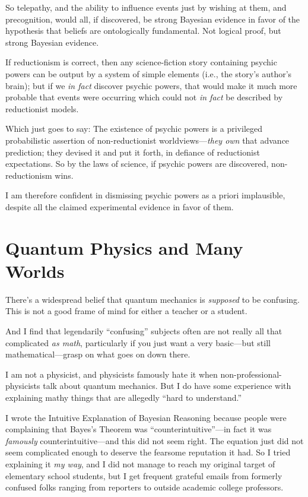 {
 So telepathy, and the ability to influence events just by wishing
at them, and precognition, would all, if discovered, be strong Bayesian
evidence in favor of the hypothesis that beliefs are ontologically
fundamental. Not logical proof, but strong Bayesian evidence.}

{
 If reductionism is correct, then any science-fiction story
containing psychic powers can be output by a system of simple elements
(i.e., the story's author's brain); but
if we \textit{in fact} discover psychic powers, that would make it much
more probable that events were occurring which could not \textit{in
fact} be described by reductionist models.}

{
 Which just goes to say: The existence of psychic powers is a
privileged probabilistic assertion of non-reductionist
worldviews---\textit{they own} that advance prediction; they devised it
and put it forth, in defiance of reductionist expectations. So by the
laws of science, if psychic powers are discovered, non-reductionism
wins.}

{
 I am therefore confident in dismissing psychic powers as a priori
implausible, despite all the claimed experimental evidence in favor of
them.}

\myendsectiontext

\chapter{Quantum Physics and Many Worlds}


{
 There's a widespread belief that quantum mechanics
is \textit{supposed} to be confusing. This is not a good frame of mind
for either a teacher or a student.}

{
 And I find that legendarily
``confusing'' subjects often are not
really all that complicated \textit{as math}, particularly if you just
want a very basic---but still mathematical---grasp on what goes on down
there.}

{
 I am not a physicist, and physicists famously hate it when
non-professional-physicists talk about quantum mechanics. But I do have
some experience with explaining mathy things that are allegedly
``hard to understand.''}

{
 I wrote the Intuitive Explanation of Bayesian Reasoning because
people were complaining that Bayes's Theorem was
``counterintuitive''---in fact it
was \textit{famously} counterintuitive---and this did not seem right.
The equation just did not seem complicated enough to deserve the
fearsome reputation it had. So I tried explaining it \textit{my way},
and I did not manage to reach my original target of elementary school
students, but I get frequent grateful emails from formerly confused
folks ranging from reporters to outside academic college professors.}

